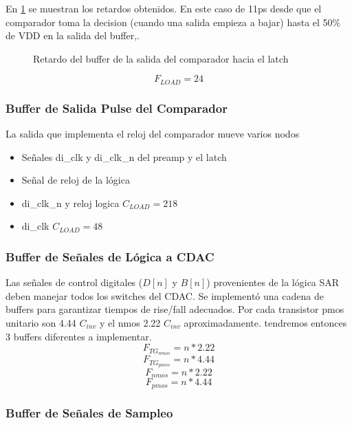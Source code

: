 \documentclass[12pt,a4paper]{report}
\begin{document}
En \cref{bufcompretardo} se muestran los retardos obtenidos. En este caso de 11ps desde que el comparador toma la decision (cuando una salida empieza a bajar) hasta el 50\% de VDD en la salida del buffer,.
\begin{figure}[H]
    \centering
    
    \caption{Retardo del buffer de la salida del comparador hacia el latch}
    \label{bufcompretardo}
\end{figure}

$$F_{LOAD} = 24$$

\subsubsection{Buffer de Salida Pulse del Comparador}
La salida que implementa el reloj del comparador mueve varios nodos
\begin{itemize}
    \item Señales di\_clk y di\_clk\_n del preamp y el latch
    \item Señal de reloj de la lógica
    \item di\_clk\_n y reloj logica $C_{LOAD} = 218 $
    \item di\_clk $C_{LOAD} = 48 $
\end{itemize}





\subsubsection{Buffer de Señales de Lógica a CDAC}

Las señales de control digitales ($D[n]$ y $B[n]$) provenientes de la lógica SAR deben manejar todos los switches del CDAC. Se implementó una cadena de buffers para garantizar tiempos de rise/fall adecuados. Por cada transistor pmos unitario son 4.44  $C_{inv}$ y el nmos 2.22  $C_{inv}$ aproximadamente. tendremos entonces 3 buffers diferentes a implementar.
$$F_{TG_{nmos}} = n*2.22$$
$$F_{TG_{pmos}} = n*4.44$$
$$F_{nmos} = n*2.22$$
$$F_{pmos} = n*4.44$$





\subsubsection{Buffer de Señales de Sampleo}
\end{document}
